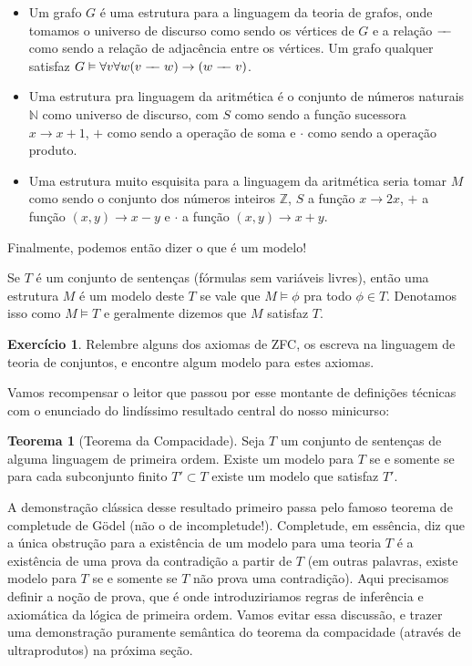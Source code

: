\documentclass[11pt]{article}
\renewcommand{\textbf}[1]{{\fakebold#1}}
\newcommand{\edge}{%
  \mathrel{-}%
  \joinrel\joinrel %
  \mathrel{-}%
}
\newcommand{\luamedio}{
\emoji{first-quarter-moon}
}
\theoremstyle{definition}
\newtheorem{theorem}{Teorema}
\newenvironment{teorema}{
\definecolor{shadecolor}{HTML}{f59aa3}
\begin{shaded}
\begin{theorem}
}
{
\end{theorem}
\end{shaded}
}
\theoremstyle{definition}
\theoremstyle{definition}
\theoremstyle{definition}
\theoremstyle{definition}
\theoremstyle{definition}
\theoremstyle{definition}
\theoremstyle{definition}
\newtheorem*{definition*}{Definição}
\newenvironment{definicao*}{
\definecolor{shadecolor}{HTML}{defcfc}
\begin{shaded}
\begin{definition*}
}
{
\end{definition*}
\end{shaded}
}
\theoremstyle{definition}
\theoremstyle{definition}
\newtheorem*{example*}{Exemplo}
\newenvironment{exemplo*}{
\definecolor{shadecolor}{HTML}{b9e6d3}
\begin{shaded}
\begin{example*}
}
{
\end{example*}
\end{shaded}
}
\theoremstyle{definition}
\theoremstyle{definition}
\theoremstyle{definition}
\newtheorem{exersisio}{Exercício}
\newenvironment{exercicio}{
\definecolor{shadecolor}{HTML}{CFB5FF}
\begin{shaded}
\begin{exersisio}
}
{
\end{exersisio}
\end{shaded}
}
\begin{document}
\begin{exemplo*}
\begin{itemize}[label=]
\item Um grafo $G$ é uma estrutura para a linguagem da teoria de grafos, onde tomamos o universo de discurso como sendo os vértices de $G$ e a relação $\edge$ como sendo a relação de adjacência entre os vértices. Um grafo qualquer satisfaz $G \vDash \forall v \forall w (v \edge w) \rightarrow (w \edge v)$.
\item Uma estrutura pra linguagem da aritmética é o conjunto de números naturais $\mathbb{N}$ como universo de discurso, com $S$ como sendo a função sucessora $x \rightarrow x + 1$, $+$ como sendo a operação de soma e $\cdot$ como sendo a operação produto.
\item Uma estrutura muito esquisita para a linguagem da aritmética seria tomar $M$ como sendo o conjunto dos números inteiros $\mathbb{Z}$, $S$ a função $x \rightarrow 2x$, $+$ a função $ (x,y) \rightarrow x - y$ e $\cdot$ a função $(x,y) \rightarrow x + y$.
\end{itemize}
\end{exemplo*}

Finalmente, podemos então dizer o que é um modelo! 

\begin{definicao*}[Modelo]
Se $T$ é um conjunto de sentenças (fórmulas sem variáveis livres), então uma estrutura $M$ é um \textbf{modelo} deste $T$ se vale que $M \vDash \phi$ pra todo $\phi \in T$. Denotamos isso como $M \vDash T$ e geralmente dizemos que $M$ satisfaz $T$.
\end{definicao*}

\begin{exercicio}
  \luamedio Relembre alguns dos axiomas de ZFC, os escreva na linguagem de teoria de conjuntos, e encontre algum modelo para estes axiomas.
\end{exercicio}
Vamos recompensar o leitor que passou por esse montante de definições técnicas com o enunciado do lindíssimo resultado central do nosso minicurso:

\begin{teorema}[Teorema da Compacidade]
  Seja $T$ um conjunto de sentenças de alguma linguagem de primeira ordem. Existe um modelo para $T$ se e somente se para cada subconjunto finito $T' \subset T$ existe um modelo que satisfaz $T'$.
\end{teorema}

A demonstração clássica desse resultado primeiro passa pelo famoso teorema de completude de Gödel (não o de incompletude!). Completude, em essência, diz que a única obstrução para a existência de um modelo para uma teoria $T$ é a existência de uma prova da contradição a partir de $T$ (em outras palavras, existe modelo para $T$ se e somente se $T$ não prova uma contradição). Aqui precisamos definir a noção de prova, que é onde introduziriamos regras de inferência e axiomática da lógica de primeira ordem. Vamos evitar essa discussão, e trazer uma demonstração puramente semântica do teorema da compacidade (através de ultraprodutos) na próxima seção.
\end{document}
